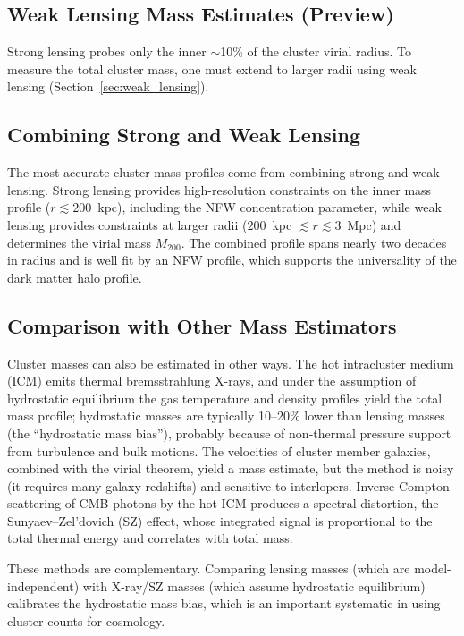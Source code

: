 \subsection{Weak Lensing Mass Estimates (Preview)}

Strong lensing probes only the inner $\sim$10\% of the cluster virial
radius.  To measure the total cluster mass, one must extend to larger
radii using weak lensing (Section~\ref{sec:weak_lensing}).

\subsection{Combining Strong and Weak Lensing}

The most accurate cluster mass profiles come from combining strong
and weak lensing.  Strong lensing provides high-resolution
constraints on the inner mass profile ($r \lesssim 200$~kpc),
including the NFW concentration parameter, while weak lensing
provides constraints at larger radii
($200$~kpc $\lesssim r \lesssim 3$~Mpc) and determines the virial
mass $M_{200}$.  The combined profile spans nearly two decades in
radius and is well fit by an NFW profile, which supports the
universality of the dark matter halo profile.

\subsection{Comparison with Other Mass Estimators}

Cluster masses can also be estimated in other ways.  The hot
intracluster medium (ICM) emits thermal bremsstrahlung X-rays, and
under the assumption of hydrostatic equilibrium the gas temperature
and density profiles yield the total mass profile; hydrostatic
masses are typically 10--20\% lower than lensing masses (the
``hydrostatic mass bias''), probably because of non-thermal pressure
support from turbulence and bulk motions.  The velocities of cluster
member galaxies, combined with the virial theorem, yield a mass
estimate, but the method is noisy (it requires many galaxy
redshifts) and sensitive to interlopers.  Inverse Compton scattering
of CMB photons by the hot ICM produces a spectral distortion, the
Sunyaev--Zel'dovich (SZ) effect, whose integrated signal is
proportional to the total thermal energy and correlates with total
mass.

\begin{remark}
These methods are complementary.  Comparing lensing
masses (which are model-independent) with X-ray/SZ masses (which
assume hydrostatic equilibrium) calibrates the hydrostatic mass bias,
which is an important systematic in using cluster counts for cosmology.
\end{remark}


